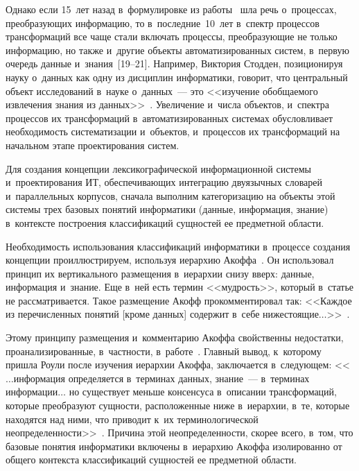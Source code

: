 \begin{multicols}{2}
  Однако если 15~лет назад в~формулировке из работы~\cite{13-zac} шла речь 
о~процессах, преобразующих информацию, то в~последние~10~лет в~спектр 
процессов трансформаций все чаще стали включать процессы, преобразующие 
не только информацию, но также и~другие объекты автоматизированных 
систем, в~первую очередь данные и~знания~[19--21]. Например, Виктория 
Стодден, позиционируя науку о~данных как одну из дисциплин информатики, 
говорит, что центральный объект исследований в~науке о~данных~--- это 
<<изучение обобщаемого извлечения знания из данных>>~\cite{21-zac}. 
Увеличение и~чис\-ла объектов, и~спект\-ра процессов их трансформаций 
в~автоматизированных сис\-те\-мах обуслов\-ли\-ва\-ет не\-об\-хо\-ди\-мость 
систематизации и~объектов, и~процессов их трансформаций на начальном этапе 
проектирования сис\-тем.
  
  Для создания концепции лексикографической информационной сис\-те\-мы 
и~проектирования ИТ, обеспечивающих интеграцию 
двуязычных словарей и~параллельных корпусов, сначала выполним 
категоризацию на объекты этой сис\-те\-мы трех базовых понятий информатики 
(данные, информация, знание) в~контексте построения классификаций 
сущностей ее предметной об\-ласти.
  
  Необходимость использования классификаций информатики в~процессе 
создания концепции проиллюстрируем, используя иерархию  
Акоффа~\cite{8-zac}. Он использовал принцип их вертикального размещения 
в~иерархии снизу вверх: данные, информация и~знание. Еще в~ней есть термин 
<<мудрость>>, который в~статье не рассматривается. Такое размещение Акофф 
прокомментировал так: <<Каждое из пе\-ре\-чис\-лен\-ных понятий [кроме данных] 
содержит в~себе нижестоящие$\ldots$>>~\cite{8-zac}.
  
  Этому принципу размещения и~комментарию Акоффа свойственны 
недостатки, проанализированные, в~частности, в~работе~\cite{10-zac}. Главный 
вывод, к~которому пришла Роули после изучения иерархии Акоффа, 
заключается в~следующем: <<$\ldots$информация определяется в~терминах 
данных, знание~--- в~терминах информации$\ldots$ но существует меньше 
консенсуса в~описании трансформаций, которые преобразуют сущности, 
расположенные ниже в~иерархии, в~те, которые находятся над ними, что 
приводит к~их терминологической неопределенности>>~\cite{10-zac}. Причина 
этой неопределенности, скорее всего, в~том, что базовые понятия информатики 
включены в~иерархию Акоффа изолированно от общего контекста 
классификаций сущностей ее предметной об\-ласти.

  

\end{multicols}
